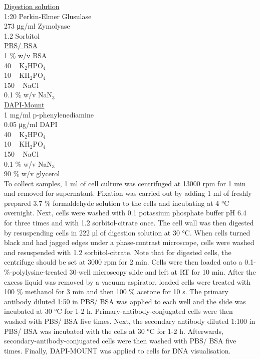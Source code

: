 \underline{Digestion solution}\\
1:20 Perkin-Elmer Glusulase \\
273 \si{\micro\gram/\milli\litre} Zymolyase\\
1.2 \si{\Molar} Sorbitol\\

\underline{PBS/ BSA}\\
1 \% w/v BSA\\
40 \si{\milli\Molar} K$_{2}$HPO$_{4}$\\
10 \si{\milli\Molar} KH$_{2}$PO$_{4}$\\
150 \si{\milli\Molar} NaCl\\
0.1 \% w/v NaN$_{3}$\\

\underline{DAPI-Mount}\\
1 \si{\milli\gram/\milli\litre} p-phenylenediamine\\
0.05 \si{\micro\gram/\milli\litre} DAPI\\
40 \si{\milli\Molar} K$_{2}$HPO$_{4}$\\
10 \si{\milli\Molar} KH$_{2}$PO$_{4}$\\
150 \si{\milli\Molar} NaCl\\
0.1 \% w/v NaN$_{3}$\\
90 \% w/v glycerol\\

To collect samples, 1 \si{\milli\litre} of cell culture was centrifuged at 13000 rpm for 1 \si{\minute} and removed for supernatant. Fixation was carried out by adding 1 \si{\milli\litre} of freshly prepared 3.7 \% formaldehyde solution to the cells and incubating at 4 \si{\celsius} overnight. Next, cells were washed with 0.1 \si{\Molar} potassium phosphate buffer pH 6.4 for three times and with 1.2 \si{\Molar} sorbitol-citrate once. The cell wall was then digested by resuspending cells in 222 \si{\micro\litre} of digestion solution at 30 \si{\celsius}. When cells turned black and had jagged edges under a phase-contrast microscope, cells were washed and resuspended with 1.2 \si{\Molar} sorbitol-citrate. Note that for digested cells, the centrifuge should be set at 3000 rpm for 2 \si{\minute}. Cells were then loaded onto a 0.1-\%-polylysine-treated 30-well microscopy slide and left at RT for 10 \si{\minute}. After the excess liquid was removed by a vacuum aspirator, loaded cells were treated with 100 \% methanol for 3 \si{\minute} and then 100 \% acetone for 10 \si{\second}. The primary antibody diluted 1:50 in PBS/ BSA was applied to each well and the slide was incubated at 30 \si{\celsius} for 1-2 \si{\hour}. Primary-antibody-conjugated cells were then washed with PBS/ BSA five times. Next, the secondary antibody diluted 1:100 in PBS/ BSA was incubated with the cells at 30 \si{\celsius} for 1-2 \si{\hour}. Afterwards, secondary-antibody-conjugated cells were then washed with PBS/ BSA five times. Finally, DAPI-MOUNT was applied to cells for DNA visualisation. 

